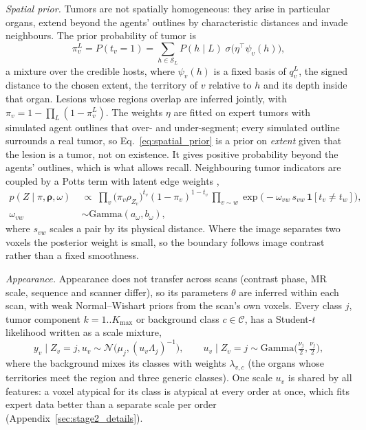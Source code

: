 \documentclass[fleqn,10pt]{olplainarticle}
\begin{document}
\emph{Spatial prior.} Tumors are not spatially homogeneous: they arise in particular organs, extend beyond the agents'
outlines by characteristic distances and invade neighbours. The prior probability of tumor is
\begin{equation}
\label{eq:spatial_prior}
\pi^L_v=P(t_v=1)=\sum_{h\in\mathcal{S}_L}P(h\mid L)\;\sigma\bigl(\eta^\top\psi_v(h)\bigr),
\end{equation}
a mixture over the credible hosts, where $\psi_v(h)$ is a fixed basis of $q^L_v$, the signed distance to the chosen extent,
the territory of $v$ relative to $h$ and its depth inside that organ. Lesions whose regions overlap are inferred jointly, with
$\pi_v=1-\prod_L(1-\pi^L_v)$. The weights $\eta$ are fitted on expert tumors with simulated agent outlines that over- and
under-segment; every simulated outline surrounds a real tumor, so Eq.~\eqref{eq:spatial_prior} is a prior on \emph{extent}
given that the lesion is a tumor, not on existence. It gives positive probability beyond the agents' outlines, which is what
allows recall. Neighbouring tumor indicators are coupled by a Potts term with latent edge weights \cite{gao2023bayeseg},
\begin{equation}
\label{eq:mrf}
\begin{aligned}
p(Z\mid\pi,\boldsymbol\rho,\omega)\;&\propto\;\textstyle\prod_{v}\bigl(\pi_v\rho_{Z_v}\bigr)^{t_v}(1-\pi_v)^{1-t_v}
\,\prod_{v\sim w}\exp\bigl(-\omega_{vw}\,s_{vw}\,\mathbf{1}[t_v\ne t_w]\bigr),\\
\omega_{vw}&\sim\mathrm{Gamma}(a_\omega,b_\omega),
\end{aligned}
\end{equation}
where $s_{vw}$ scales a pair by its physical distance. Where the image separates two voxels the posterior weight is small, so
the boundary follows image contrast rather than a fixed smoothness.

\emph{Appearance.} Appearance does not transfer across scans (contrast phase, MR scale, sequence and scanner differ), so its
parameters $\theta$ are inferred within each scan, with weak Normal--Wishart priors from the scan's own voxels. Every class
$j$, tumor component $k=1..K_{\max}$ or background class $c\in\mathcal{C}$, has a Student-$t$ likelihood written as a scale
mixture,
\begin{equation}
\label{eq:appearance}
y_v\mid Z_v{=}j,u_v\sim\mathcal{N}\bigl(\mu_j,(u_v\Lambda_j)^{-1}\bigr),\qquad u_v\mid Z_v{=}j\sim\mathrm{Gamma}\bigl(\tfrac{\nu_j}{2},\tfrac{\nu_j}{2}\bigr),
\end{equation}
where the background mixes its classes with weights $\lambda_{v,c}$ (the organs whose territories meet the region and three
generic classes). One scale $u_v$ is shared by all features: a voxel atypical for its class is atypical at every order at
once, which fits expert data better than a separate scale per order (Appendix~\ref{sec:stage2_details}).
\end{document}
